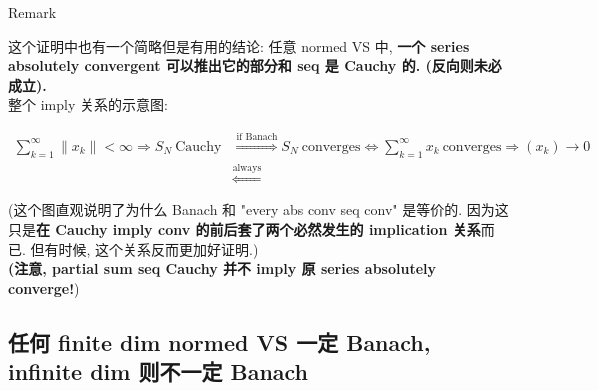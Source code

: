 \documentclass{qlnotes-export}
\begin{document}
\begin{qlremark}{Remark}

这个证明中也有一个简略但是有用的结论: 任意 normed VS 中, \textbf{一个 series absolutely convergent 可以推出它的部分和 seq 是 Cauchy 的. (反向则未必成立).}\\
整个 imply 关系的示意图:

\[\begin{matrix}
{\sum\limits_{k = 1}^{\infty} \parallel x_{k} \parallel < \infty\Longrightarrow S_{N}\ \text{Cauchy}} & {\overset{\text{if Banach}}{\Longrightarrow}S_{N}\ \text{converges}\Leftrightarrow\sum\limits_{k = 1}^{\infty}x_{k}\ \text{converges}\Longrightarrow(x_{k})\rightarrow 0} \\
 & \overset{\text{always}}{\Longleftarrow}
\end{matrix}\]

(这个图直观说明了为什么 Banach 和 "every abs conv seq conv" 是等价的. 因为这只是\textbf{在 Cauchy imply conv 的前后套了两个必然发生的 implication 关系}而已. 但有时候, 这个关系反而更加好证明.)\\
\textbf{(注意, partial sum seq Cauchy 并不 imply 原 series absolutely converge!})

\end{qlremark}

\subsection{任何 finite dim normed VS 一定 Banach, infinite dim 则不一定 Banach}\label{ux4efbux4f55-finite-dim-normed-vs-ux4e00ux5b9a-banach-infinite-dim-ux5219ux4e0dux4e00ux5b9a-banach}
\end{document}
